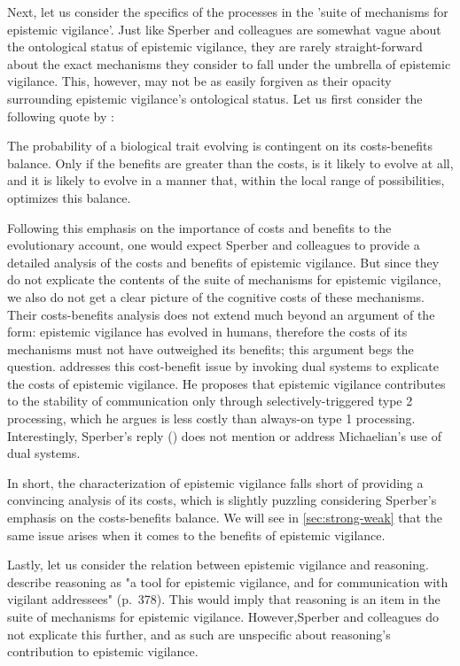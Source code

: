 Next, let us consider the specifics of the processes in the 'suite of mechanisms for epistemic vigilance'. Just like Sperber and colleagues are somewhat vague about the ontological status of epistemic vigilance, they are rarely straight-forward about the exact mechanisms they consider to fall under the umbrella of epistemic vigilance. This, however, may not be as easily forgiven as their opacity surrounding epistemic vigilance's ontological status. Let us first consider the following quote by \citet{Sperber13}:
\begin{quoting}
    The probability of a biological trait evolving is contingent on its costs-benefits balance. Only if the benefits are greater than the costs, is it likely to evolve at all, and it is likely to evolve in a manner that, within the local range of possibilities, optimizes this balance.
    \hfill \citep[p.~62]{Sperber13}
\end{quoting}
Following this emphasis on the importance of costs and benefits to the evolutionary account, one would expect Sperber and colleagues to provide a detailed analysis of the costs and benefits of epistemic vigilance.
But since they do not explicate the contents of the suite of mechanisms for epistemic vigilance, we also do not get a clear picture of the cognitive costs of these mechanisms.
Their costs-benefits analysis does not extend much beyond an argument of the form: epistemic vigilance has evolved in humans, therefore the costs of its mechanisms must not have outweighed its benefits; this argument begs the question.
\citet{Michaelian13} addresses this cost-benefit issue by invoking dual systems to explicate the costs of epistemic vigilance. He proposes that epistemic vigilance contributes to the stability of communication only through selectively-triggered type 2 processing, which he argues is less costly than always-on type 1 processing. Interestingly, Sperber's reply (\citeyear{Sperber13}) does not mention or address Michaelian's use of dual systems.

In short, the characterization of epistemic vigilance falls short of providing a convincing analysis of its costs, which is slightly puzzling considering Sperber's emphasis on the costs-benefits balance. We will see in \cref{sec:strong-weak} that the same issue arises when it comes to the benefits of epistemic vigilance.

Lastly, let us consider the relation between epistemic vigilance and reasoning. \citet{Sperber10} describe reasoning as "a tool for epistemic vigilance, and for communication with vigilant addressees" (p.~378). This would imply that reasoning is an item in the suite of mechanisms for epistemic vigilance. However,Sperber and colleagues do not explicate this further, and as such are unspecific about reasoning's contribution to epistemic vigilance.

